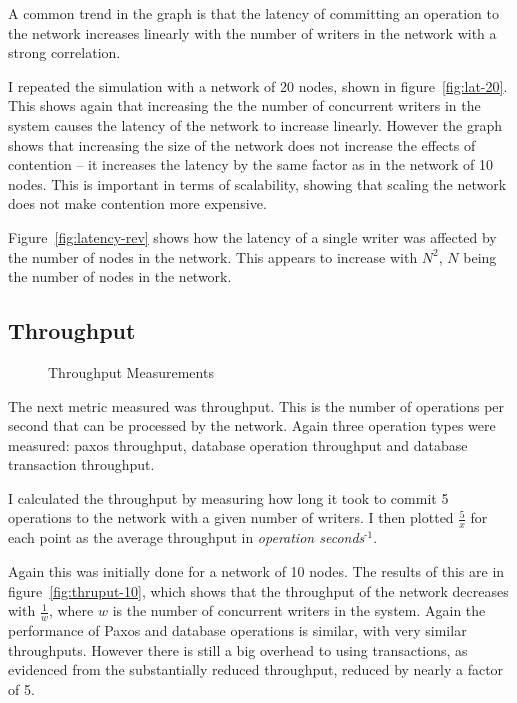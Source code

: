 \documentclass[12pt,twoside,notitlepage]{report}
\newcommand{\superscript}[1]{\ensuremath{^{\textrm{#1}}}}
\begin{document}
A common trend in the graph is that the latency of committing an operation to the
network increases linearly with the number of writers in the network with a strong
correlation.

I repeated the simulation with a network of 20 nodes, shown in figure~\ref{fig:lat-20}.  This
shows again that increasing the the number of concurrent writers in the system causes the latency
of the network to increase linearly. However the graph shows that increasing the size of the
network does not increase the effects of contention -- it increases the latency by the same factor
as in the network of 10 nodes. This is important in terms of scalability, showing that scaling the
network does not make contention more expensive.

Figure~\ref{fig:latency-rev} shows how the latency of a single writer was affected by the number
of nodes in the network. This appears to increase with $N^2$, $N$ being the number of nodes in the
network.

\subsection{Throughput}

\begin{figure}[Hp]
\centering
{}
\caption{Throughput Measurements}
\end{figure}

The next metric measured was throughput. This is the number of operations per second that
can be processed by the network. Again three operation types were measured: paxos throughput,
database operation throughput and database transaction throughput.

I calculated the throughput by measuring how long it took to commit 5 operations to the network with
a given number of writers. I then plotted $\frac{5}{x}$ for each point as the average throughput in
\emph{operation seconds\superscript{-1}}.

Again this was initially done for a network of 10 nodes. The results of this are in
figure~\ref{fig:thruput-10}, which shows that the throughput of the network decreases with
$\frac{1}{w}$, where $w$ is the number of concurrent writers in the system. Again the performance of
Paxos and database operations is similar, with very similar throughputs. However there is still a
big overhead to using transactions, as evidenced from the substantially reduced throughput,
reduced by nearly a factor of 5.
\end{document}
